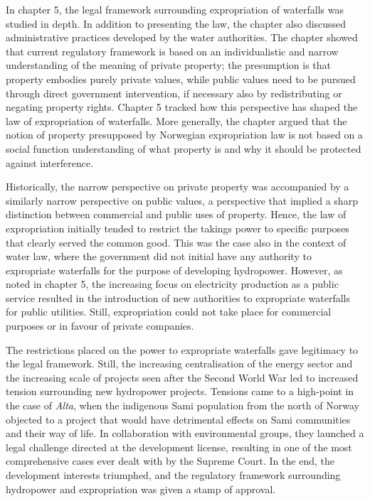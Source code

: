 In chapter 5, the legal framework surrounding expropriation of waterfalls was studied in depth. In addition to presenting the law, the chapter also discussed administrative practices developed by the water authorities. The chapter showed that current regulatory framework is based on an individualistic and narrow understanding of the meaning of private property; the presumption is that property embodies purely private values, while public values need to be pursued through direct government intervention, if necessary also by redistributing or negating property rights. Chapter 5 tracked how this perspective has shaped the law of expropriation of waterfalls. More generally, the chapter argued that the notion of property presupposed by Norwegian expropriation law is not based on a social function understanding of what property is and why it should be protected against interference.

Historically, the narrow perspective on private property was accompanied by a similarly narrow perspective on public values, a perspective that implied a sharp distinction between commercial and public uses of property. Hence, the law of expropriation initially tended to restrict the takings power to specific purposes that clearly served the common good. This was the case also in the context of water law, where the government did not initial have any authority to expropriate waterfalls for the purpose of developing hydropower. However, as noted in chapter 5, the increasing focus on electricity production as a public service resulted in the introduction of new authorities to expropriate waterfalls for public utilities. Still, expropriation could not take place for commercial purposes or in favour of private companies.

The restrictions placed on the power to expropriate waterfalls gave legitimacy to the legal framework. Still, the increasing centralisation of the energy sector and the increasing scale of projects seen after the Second World War led to increased tension surrounding new hydropower projects. Tensions came to a high-point in the case of {\it Alta}, when the indigenous Sami population from the north of Norway objected to a project that would have detrimental effects on Sami communities and their way of life. In collaboration with environmental groups, they launched a legal challenge directed at the development license, resulting in one of the most comprehensive cases ever dealt with by the Supreme Court. In the end, the development interests triumphed, and the regulatory framework surrounding hydropower and expropriation was given a stamp of approval. 

